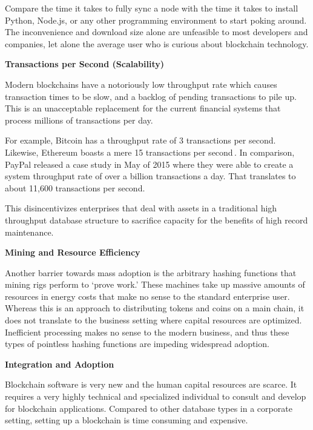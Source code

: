 \documentclass{%
	article}
\begin{document}
Compare the time it takes to fully sync a node with the time it takes to install Python, Node.js, or any other programming environment to start poking around. The inconvenience and download size alone are unfeasible to most developers and companies, let alone the average user who is curious about blockchain technology.

\begin{center}
\textbf{Transactions per Second (Scalability)}
\end{center}

Modern blockchains have a notoriously low throughput rate which causes transaction times to be slow, and a backlog of pending transactions to pile up. This is an unacceptable replacement for the current financial systems that process millions of transactions per day.

For example, Bitcoin has a throughput rate of 3 transactions per second. Likewise, Ethereum boasts a mere 15 transactions per second\,\cite{transactbandwidth}. In comparison, PayPal released a case study in May of 2015 where they were able to create a system throughput rate of over a billion transactions a day. That translates to about 11,600 transactions per second\cite{paypalcasestudy}.

This disincentivizes enterprises that deal with assets in a traditional high throughput database structure to sacrifice capacity for the benefits of high record maintenance.

\begin{center}
\textbf{Mining and Resource Efficiency}
\end{center}

Another barrier towards mass adoption is the arbitrary hashing functions that mining rigs perform to ‘prove work.’ These machines take up massive amounts of resources in energy costs that make no sense to the standard enterprise user. Whereas this is an approach to distributing tokens and coins on a main chain, it does not translate to the business setting where capital resources are optimized. Inefficient processing makes no sense to the modern business, and thus these types of pointless hashing functions are impeding widespread adoption.

\begin{center}
\textbf{Integration and Adoption}
\end{center}
Blockchain software is very new and the human capital resources are scarce. It requires a very highly technical and specialized individual to consult and develop for blockchain applications. Compared to other database types in a corporate setting, setting up a blockchain is time consuming and expensive. 
\end{document}
